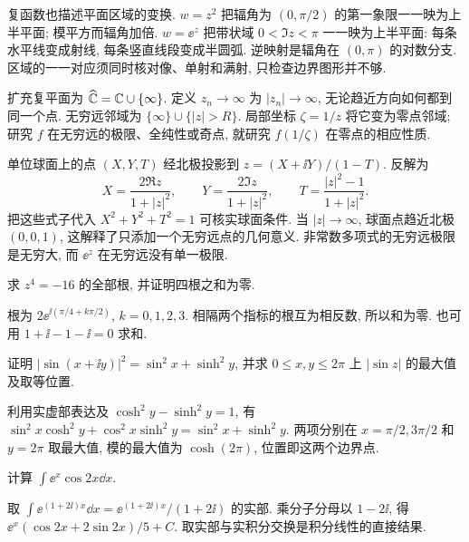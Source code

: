 复函数也描述平面区域的变换. $w=z^2$ 把辐角为 $(0,\pi/2)$ 的第一象限一一映为上半平面; 模平方而辐角加倍. $w=\ee^z$ 把带状域 $0<\Im z<\pi$ 一一映为上半平面: 每条水平线变成射线, 每条竖直线段变成半圆弧. 逆映射是辐角在 $(0,\pi)$ 的对数分支. 区域的一一对应须同时核对像、单射和满射, 只检查边界图形并不够.

扩充复平面为 $\widehat{\mathbb C}=\mathbb C\cup\{\infty\}$. 定义 $z_n\to\infty$ 为 $|z_n|\to\infty$, 无论趋近方向如何都到同一个点. 无穷远邻域为 $\{\infty\}\cup\{|z|>R\}$. 局部坐标 $\zeta=1/z$ 将它变为零点邻域; 研究 $f$ 在无穷远的极限、全纯性或奇点, 就研究 $f(1/\zeta)$ 在零点的相应性质.

单位球面上的点 $(X,Y,T)$ 经北极投影到 $z=(X+\ii Y)/(1-T)$. 反解为
\[
X=\frac{2\Re z}{1+|z|^2},\qquad Y=\frac{2\Im z}{1+|z|^2},\qquad
T=\frac{|z|^2-1}{1+|z|^2}.
\]
把这些式子代入 $X^2+Y^2+T^2=1$ 可核实球面条件. 当 $|z|\to\infty$, 球面点趋近北极 $(0,0,1)$, 这解释了只添加一个无穷远点的几何意义. 非常数多项式的无穷远极限是无穷大, 而 $\ee^z$ 在无穷远没有单一极限.

\begin{exercise}
求 $z^4=-16$ 的全部根, 并证明四根之和为零.
\end{exercise}
\begin{solution}
根为 $2\ee^{\ii(\pi/4+k\pi/2)}$, $k=0,1,2,3$. 相隔两个指标的根互为相反数, 所以和为零. 也可用 $1+\ii-1-\ii=0$ 求和.
\end{solution}
\begin{exercise}
证明 $|\sin(x+\ii y)|^2=\sin^2x+\sinh^2y$, 并求 $0\le x,y\le2\pi$ 上 $|\sin z|$ 的最大值及取等位置.
\end{exercise}
\begin{solution}
利用实虚部表达及 $\cosh^2y-\sinh^2y=1$, 有 $\sin^2x\cosh^2y+\cos^2x\sinh^2y=\sin^2x+\sinh^2y$. 两项分别在 $x=\pi/2,3\pi/2$ 和 $y=2\pi$ 取最大值, 模的最大值为 $\cosh(2\pi)$, 位置即这两个边界点.
\end{solution}
\begin{exercise}
计算 $\int\ee^x\cos2x\dd x$.
\end{exercise}
\begin{solution}
取 $\int\ee^{(1+2\ii)x}\dd x=\ee^{(1+2\ii)x}/(1+2\ii)$ 的实部. 乘分子分母以 $1-2\ii$, 得 $\ee^x(\cos2x+2\sin2x)/5+C$. 取实部与实积分交换是积分线性的直接结果.
\end{solution}
